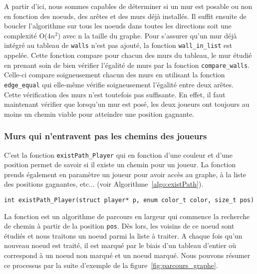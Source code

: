 \documentclass[a4paper]{article}
\begin{document}
A partir d'ici, nous sommes capables de déterminer si un mur est posable ou non en fonction des noeuds, des arêtes et des murs déjà installés. Il suffit ensuite de boucler l'algorithme sur tous les noeuds dans toutes les directions soit une complexité O(4$n^2$) avec n la taille du graphe. Pour s'assurer qu'un mur déjà intégré au tableau de  \texttt{walls} n'est pas ajouté, la fonction \texttt{wall\_in\_list} est appelée. Cette fonction compare pour chacun des murs du tableau, le mur étudié en prenant soin de bien vérifier l'égalité de murs par la fonction \texttt{compare\_walls}. Celle-ci compare soigneusement chacun des murs en utilisant la fonction \texttt{edge\_equal} qui elle-même vérifie soigneusement l'égalité entre deux arêtes. \\

Cette vérification des murs n'est toutefois pas suffisante. En effet, il faut maintenant vérifier que lorsqu'un mur est posé, les deux joueurs ont toujours au moins un chemin viable pour atteindre une position gagnante. \\

\subsubsection{Murs qui n'entravent pas les chemins des joueurs}

C'est la fonction \texttt{existPath\_Player} qui en fonction d'une couleur et d'une position permet de savoir si il existe un chemin pour un joueur. La fonction prends également en paramètre un joueur pour avoir accès au graphe, à la liste des positions gagnantes, etc... (voir Algorithme~\ref{algo:existPath}).

\begin{lstlisting}[caption = {Spécification de la fonction déterminant l'existence d'un chemin}, label = {algo:existPath}, float = h]
int existPath_Player(struct player* p, enum color_t color, size_t pos)
\end{lstlisting}

La fonction est un algorithme de parcours en largeur qui commence la recherche de chemin à partir de la position \texttt{pos}. Dès lors, les voisins de ce noeud sont étudiés et nous traitons un noeud parmi la liste à traiter. A chaque fois qu'un nouveau noeud est traité, il est marqué par le biais d'un tableau d'entier où  correspond à un noeud non marqué et  un noeud marqué. Nous pouvons résumer ce processus par la suite d'exemple de la figure~\ref{fig:parcours_graphe}. \\
\end{document}
